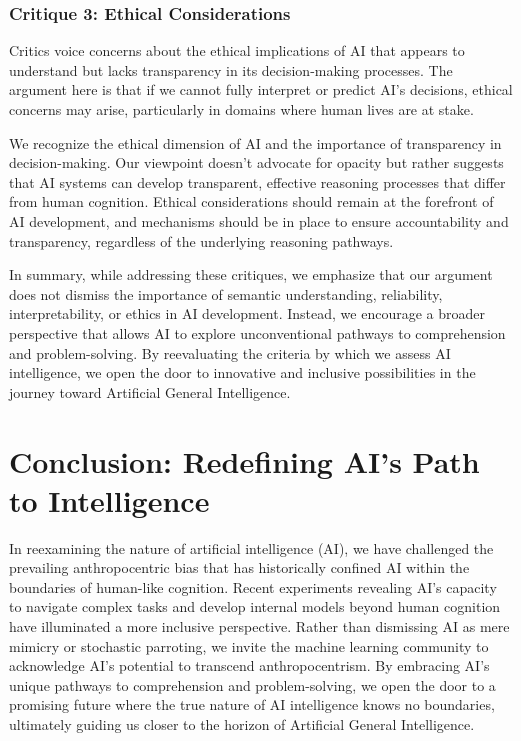 \documentclass{article}
\begin{document}
\subsubsection{Critique 3: Ethical Considerations}

Critics voice concerns about the ethical implications of AI that appears to understand but lacks transparency in its decision-making processes. 
The argument here is that if we cannot fully interpret or predict AI's decisions, ethical concerns may arise, particularly in domains where human lives are at stake.\par

We recognize the ethical dimension of AI and the importance of transparency in decision-making. 
Our viewpoint doesn't advocate for opacity but rather suggests that AI systems can develop transparent, effective reasoning processes that differ from human cognition. 
Ethical considerations should remain at the forefront of AI development, and mechanisms should be in place to ensure accountability and transparency, regardless of the underlying reasoning pathways.\par

In summary, while addressing these critiques, we emphasize that our argument does not dismiss the importance of semantic understanding, reliability, interpretability, or ethics in AI development. Instead, we encourage a broader perspective that allows AI to explore unconventional pathways to comprehension and problem-solving. By reevaluating the criteria by which we assess AI intelligence, we open the door to innovative and inclusive possibilities in the journey toward Artificial General Intelligence.

\section{Conclusion: Redefining AI's Path to Intelligence}

In reexamining the nature of artificial intelligence (AI), we have challenged the prevailing anthropocentric bias that has historically confined AI within the boundaries of human-like cognition. 
Recent experiments revealing AI's capacity to navigate complex tasks and develop internal models beyond human cognition have illuminated a more inclusive perspective. 
Rather than dismissing AI as mere mimicry or stochastic parroting, we invite the machine learning community to acknowledge AI's potential to transcend anthropocentrism. 
By embracing AI's unique pathways to comprehension and problem-solving, we open the door to a promising future where the true nature of AI intelligence knows no boundaries, ultimately guiding us closer to the horizon of Artificial General Intelligence.
\end{document}
